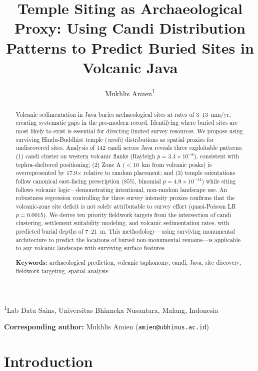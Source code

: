 \documentclass[12pt,a4paper]{article}
\title{Temple Siting as Archaeological Proxy: Using Candi Distribution Patterns to Predict Buried Sites in Volcanic Java}
\author{Mukhlis Amien\textsuperscript{1}}
\date{}
\begin{document}
\maketitle

\noindent\textsuperscript{1}Lab Data Sains, Universitas Bhinneka Nusantara, Malang, Indonesia

\vspace{1em}
\noindent\textbf{Corresponding author:} Mukhlis Amien (\texttt{amien@ubhinus.ac.id})

\begin{abstract}
Volcanic sedimentation in Java buries archaeological sites at rates of 3--13~mm/yr, creating systematic gaps in the pre-modern record. Identifying where buried sites are most likely to exist is essential for directing limited survey resources. We propose using surviving Hindu-Buddhist temple (\emph{candi}) distributions as spatial proxies for undiscovered sites. Analysis of 142 candi across Java reveals three exploitable patterns: (1) candi cluster on western volcanic flanks (Rayleigh $p=3.4\times10^{-8}$), consistent with tephra-sheltered positioning; (2) Zone A ($<$10~km from volcanic peaks) is overrepresented by 17.9$\times$ relative to random placement; and (3) temple orientations follow canonical east-facing prescription ($85\%$, binomial $p=4.9\times10^{-14}$) while siting follows volcanic logic---demonstrating intentional, non-random landscape use. An robustness regression controlling for three survey intensity proxies confirms that the volcanic-zone site deficit is not solely attributable to survey effort (quasi-Poisson LR $p=0.0015$). We derive ten priority fieldwork targets from the intersection of candi clustering, settlement suitability modeling, and volcanic sedimentation rates, with predicted burial depths of 7--21~m. This methodology---using surviving monumental architecture to predict the locations of buried non-monumental remains---is applicable to any volcanic landscape with surviving surface features.

\vspace{0.5em}
\noindent\textbf{Keywords:} archaeological prediction, volcanic taphonomy, candi, Java, site discovery, fieldwork targeting, spatial analysis
\end{abstract}

\newpage

\section{Introduction}
\end{document}
